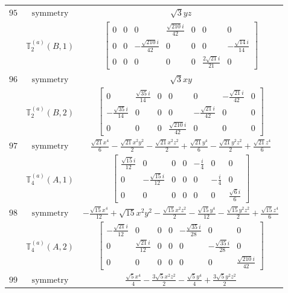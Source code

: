 \documentclass[fleqn,8pt,landscape]{jsarticle}
\begin{document}
\begin{longtable}{ccc}
$ 95 $ & $ \text{symmetry} $ & $ \sqrt{3} y z $ \\
$  $ & $ \mathbb{T}_{2}^{(a)}(B,1) $ & $ \begin{bmatrix} 0 & 0 & 0 & \frac{\sqrt{210} i}{42} & 0 & 0 & 0 \\ 0 & 0 & - \frac{\sqrt{210} i}{42} & 0 & 0 & 0 & - \frac{\sqrt{14} i}{14} \\ 0 & 0 & 0 & 0 & 0 & \frac{2 \sqrt{21} i}{21} & 0 \end{bmatrix} $ \\ \hline
$ 96 $ & $ \text{symmetry} $ & $ \sqrt{3} x y $ \\
$  $ & $ \mathbb{T}_{2}^{(a)}(B,2) $ & $ \begin{bmatrix} 0 & \frac{\sqrt{35} i}{14} & 0 & 0 & 0 & - \frac{\sqrt{21} i}{42} & 0 \\ - \frac{\sqrt{35} i}{14} & 0 & 0 & 0 & - \frac{\sqrt{21} i}{42} & 0 & 0 \\ 0 & 0 & 0 & \frac{\sqrt{210} i}{42} & 0 & 0 & 0 \end{bmatrix} $ \\ \hline
$ 97 $ & $ \text{symmetry} $ & $ \frac{\sqrt{21} x^{4}}{6} - \frac{\sqrt{21} x^{2} y^{2}}{2} - \frac{\sqrt{21} x^{2} z^{2}}{2} + \frac{\sqrt{21} y^{4}}{6} - \frac{\sqrt{21} y^{2} z^{2}}{2} + \frac{\sqrt{21} z^{4}}{6} $ \\
$  $ & $ \mathbb{T}_{4}^{(a)}(A,1) $ & $ \begin{bmatrix} \frac{\sqrt{15} i}{12} & 0 & 0 & 0 & - \frac{i}{4} & 0 & 0 \\ 0 & - \frac{\sqrt{15} i}{12} & 0 & 0 & 0 & - \frac{i}{4} & 0 \\ 0 & 0 & 0 & 0 & 0 & 0 & \frac{\sqrt{6} i}{6} \end{bmatrix} $ \\ \hline
$ 98 $ & $ \text{symmetry} $ & $ - \frac{\sqrt{15} x^{4}}{12} + \sqrt{15} x^{2} y^{2} - \frac{\sqrt{15} x^{2} z^{2}}{2} - \frac{\sqrt{15} y^{4}}{12} - \frac{\sqrt{15} y^{2} z^{2}}{2} + \frac{\sqrt{15} z^{4}}{6} $ \\
$  $ & $ \mathbb{T}_{4}^{(a)}(A,2) $ & $ \begin{bmatrix} - \frac{\sqrt{21} i}{12} & 0 & 0 & 0 & - \frac{\sqrt{35} i}{28} & 0 & 0 \\ 0 & \frac{\sqrt{21} i}{12} & 0 & 0 & 0 & - \frac{\sqrt{35} i}{28} & 0 \\ 0 & 0 & 0 & 0 & 0 & 0 & \frac{\sqrt{210} i}{42} \end{bmatrix} $ \\ \hline
$ 99 $ & $ \text{symmetry} $ & $ \frac{\sqrt{5} x^{4}}{4} - \frac{3 \sqrt{5} x^{2} z^{2}}{2} - \frac{\sqrt{5} y^{4}}{4} + \frac{3 \sqrt{5} y^{2} z^{2}}{2} $ \\

\end{longtable}
\end{document}
